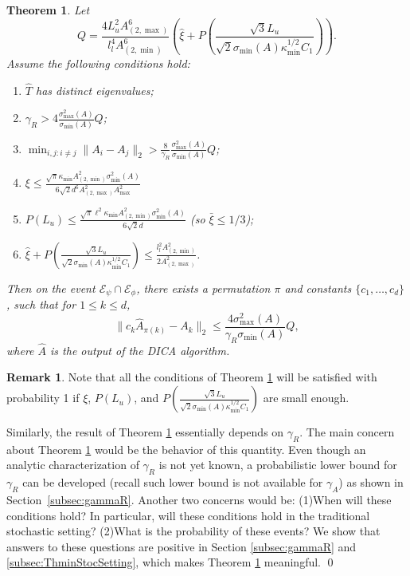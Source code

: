 \documentclass[twoside]{article}
\newcommand{\Epsi}{\mathcal{E}_{\psi}}
\newcommand{\Ephi}{\mathcal{E}_{\phi}}
\newtheorem{thm}[lemma]{Theorem}
\theoremstyle{definition}
\newtheorem{remark}[lemma]{Remark}
\begin{document}
\begin{thm}
\label{thm:Modefficiency}
Let 
 \[ 
 Q=  
 \frac{4L_u^2A^6_{(2,\max)}}{l_l^4 A^6_{(2,\min)}}\left(\widehat{\xi}
 +
 P\left(\frac{\sqrt{3}L_u}{\sqrt{2}\sigma_{\min}(A)\kappa_{\min}^{1/2}C_1}\right)\right).
 \] 
 Assume the following conditions hold:
 \begin{enumerate}
 \vspace{-3mm}
 \item $\widehat{T}$ has distinct eigenvalues;
 \item $\gamma_R > 4 \frac{\sigma_{\max}^2(A)}{\sigma_{\min}(A) }Q$; 
 \item $\min_{i,j:i\neq j} \|A_i - A_j\|_2 > \frac{8}{\gamma_R}\frac{\sigma_{\max}^2(A)}{\sigma_{\min}(A) } Q$;
 \item $\xi \le \frac{\sqrt{\pi}\kappa_{\min}A^2_{(2,\min)}\sigma_{\min}^2(A)}{6\sqrt{2}d^6A_{(2,\max)}^2A_{\max}^2}$
 \item $P(L_u) \le \frac{\sqrt{\pi}\ell^2\kappa_{\min}A^2_{(2,\min)}\sigma_{\min}^2(A)}{6\sqrt{2}d}$
 (so $\bar{\xi} \le 1/3$);
 \item $\widehat{\xi}
  +
  P\left(\frac{\sqrt{3}L_u}{\sqrt{2}\sigma_{\min}(A)\kappa_{\min}^{1/2}C_1}\right) \le \frac{l_l^2 A^2_{(2,\min)}}{2A^2_{(2,\max)}}$.
 \end{enumerate}
 \vspace{-2mm}
Then on the event $\Epsi \cap\Ephi$, there exists a permutation $\pi$ and constants $\{c_1,\ldots,c_d\}$, such that for $1\le k\le d$,
\[
\| c_k\widehat{A}_{\pi(k)} - A_k\|_2 \le \frac{4\sigma^2_{\max}(A)}{\gamma_R\sigma_{\min}(A)} Q,
\]
where $\widehat{A}$ is the output of the DICA algorithm.
\end{thm}
\begin{remark}
Note that all the conditions of Theorem \ref{thm:Modefficiency} will be satisfied with probability 1 if $\xi$, $P(L_u)$, and $P\left(\frac{\sqrt{3}L_u}{\sqrt{2}\sigma_{\min}(A)\kappa_{\min}^{1/2}C_1}\right)$  are small enough.

Similarly, the result of Theorem \ref{thm:Modefficiency} essentially depends on $\gamma_R$. 
The main concern about Theorem \ref{thm:Modefficiency} would be the behavior of this quantity. 
Even though an analytic characterization of $\gamma_R$ is not yet known, a probabilistic lower bound for $\gamma_R$ can be developed (recall such lower bound is not available for $\gamma_A$) as shown in Section~\ref{subsec:gammaR}.
Another two concerns would be: (1)When will these conditions hold? In particular, will these conditions hold in the traditional stochastic setting? (2)What is the probability of these events?
We show that answers to these questions are positive in Section \ref{subsec:gammaR} and \ref{subsec:ThminStocSetting}, which makes Theorem \ref{thm:Modefficiency} meaningful. \qed
\end{remark}
\end{document}
